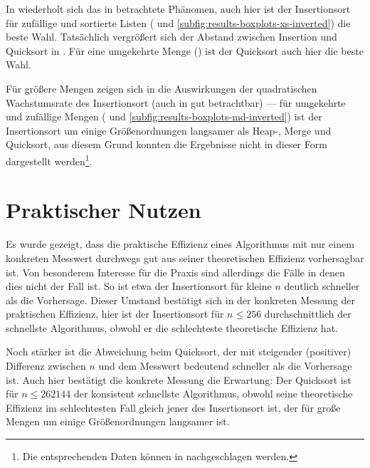 

In  wiederholt sich das in  betrachtete Phänomen, auch hier ist der Insertionsort für zufällige und sortierte Listen ( und \ref{subfig:results-boxplots-xs-inverted}) die beste Wahl. Tatsächlich vergrößert sich der Abstand zwischen Insertion und Quicksort in . Für eine umgekehrte Menge () ist der Quicksort auch hier die beste Wahl.



Für größere Mengen zeigen sich in  die Auswirkungen der quadratischen Wachstumsrate des Insertionsort (auch in  gut betrachtbar) --- für umgekehrte und zufällige Mengen ( und \ref{subfig:results-boxplots-md-inverted}) ist der Insertionsort um einige Größenordnungen langsamer als Heap-, Merge und Quicksort, aus diesem Grund konnten die Ergebnisse nicht in dieser Form dargestellt werden\footnote{Die entsprechenden Daten können in  nachgeschlagen werden.}.

\section{Praktischer Nutzen}

Es wurde gezeigt, dass die praktische Effizienz eines Algorithmus mit nur einem konkreten Messwert durchwegs gut aus seiner theoretischen Effizienz vorhersagbar ist. Von besonderem Interesse für die Praxis sind allerdings die Fälle in denen dies nicht der Fall ist. So ist etwa der Insertionsort für kleine $n$ deutlich schneller als die Vorhersage. Dieser Umstand bestätigt sich in der konkreten Messung der praktischen Effizienz, hier ist der Insertionsort für $n \leq 256$ durchschnittlich der schnellste Algorithmus, obwohl er die schlechteste theoretische Effizienz hat.

Noch stärker ist die Abweichung beim Quicksort, der mit steigender (positiver) Differenz zwischen $n$ und dem Messwert bedeutend schneller als die Vorhersage ist. Auch hier bestätigt die konkrete Messung die Erwartung: Der Quicksort ist für $n \leq 262144$ der konsistent schnellste Algorithmus, obwohl seine theoretische Effizienz im schlechtesten Fall gleich jener des Insertionsort ist, der für große Mengen um einige Größenordnungen langsamer ist.
